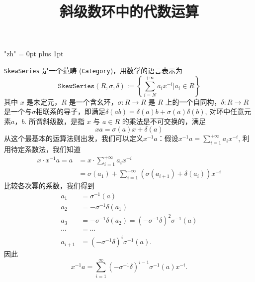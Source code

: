 \documentclass{article}
\title{斜级数环中的代数运算}
\date{}
\begin{document}
\maketitle

\XeTeXlinebreaklocale "zh"
\XeTeXlinebreakskip = 0pt plus 1pt

{\tt SkewSeries} 是一个范畴 ({\tt Category})，用数学的语言表示为
\begin{equation}
  \label{eq:1}
  \mathtt{SkewSeries}(R,\sigma,\delta) := \left\{ \sum_{i=N}^{+\infty}a_ix^{-i}\bigg| a_i\in R\right\}
\end{equation}
其中 $x$ 是未定元，$R$ 是一个含幺环，$\sigma:R\longrightarrow R$ 是 $R$ 上的一个自同构，$\delta:
R\longrightarrow R$ 是一个与$\sigma$相联系的导子，即满足$\delta(ab) = \delta(a) b + \sigma(a)
\delta(b)$, 对环中任意元素$a$，$b$. 所谓斜级数，是指 $x$ 与 $a\in R$ 的乘法是不可交换的，满足
\begin{equation}
  \label{eq:2}
  x a = \sigma(a) x + \delta(a)
\end{equation}
从这个最基本的运算法则出发，我们可以定义$x^{-1}a$：假设$x^{-1} a = \sum_{i=1}^{+\infty}a_i x^{-i}$,
利用待定系数法，我们知道
\begin{align*}
  x\cdot x^{-1} a = a &= x\cdot \sum_{i=1}^{+\infty}a_i x^{-i}\\
  &=\sigma(a_1) + \sum_{i=1}^{+\infty}\left(\sigma(a_{i+1})+\delta(a_i)\right)x^{-i}
\end{align*}
比较各次幂的系数，我们得到
\begin{align*}
  a_1 &= \sigma^{-1}(a)\\
  a_2 &= -\sigma^{-1}\delta(a_1)\\
  a_3 &= -\sigma^{-1}\delta(a_2)=\left(-\sigma^{-1}\delta\right)^2\sigma^{-1}(a)\\
  \cdots &=\cdots\\
  a_{i+1} &= \left(-\sigma^{-1}\delta\right)^{i}\sigma^{-1}(a).
\end{align*}
因此
\begin{displaymath}
  x^{-1} a = \sum_{i=1}^\infty \left(-\sigma^{-1}\delta\right)^{i-1}\sigma^{-1}(a) x^{-i}.
\end{displaymath}
\end{document}
